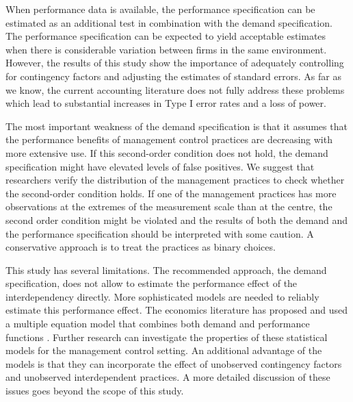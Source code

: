 \documentclass[12pt]{article}
\begin{document}
When performance data is available, the performance specification can be estimated as an additional test in combination with the demand specification. The performance specification can be expected to yield acceptable estimates when there is considerable variation between firms in the same environment. However, the results of this study show the importance of adequately controlling for contingency factors and adjusting the estimates of standard errors. As far as we know, the current accounting literature does not fully address these problems which lead to substantial increases in Type I error rates and a loss of power.

The most important weakness of the demand specification is that it assumes that the performance benefits of management control practices are decreasing with more extensive use. If this second-order condition does not hold, the demand specification might have elevated levels of false positives. We suggest that researchers verify the distribution of the management practices to check whether the second-order condition holds. If one of the management practices has more observations at the extremes of the measurement scale than at the centre, the second order condition might be violated and the results of both the demand and the performance specification should be interpreted with some caution. A conservative approach is to treat the practices as binary choices. 

This study has several limitations.  The recommended approach, the demand specification, does not allow to estimate the performance effect of the interdependency directly. More sophisticated models are needed to reliably estimate this performance effect. The economics literature has proposed and used a multiple equation model that combines both demand and performance functions \citep{athey_empirical_1998, gentzkow_valuing_2007, kretschmer_competitive_2012, miravete_innovation_2006}. Further research can investigate the properties of these statistical models for the management control setting. An additional advantage of the models is that they can incorporate the effect of unobserved contingency factors and unobserved interdependent practices. A more detailed discussion of these issues goes beyond the scope of this study.
\end{document}
